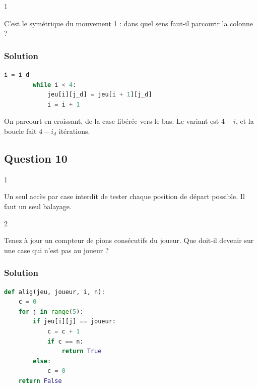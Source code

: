 \documentclass[11pt,a4paper]{article}
\begin{document}
\begin{indication}{1}

C'est le symétrique du mouvement 1 : dans quel sens faut-il parcourir la colonne ?

\end{indication}

\hypertarget{solution-8}{%
\subsubsection{Solution}\label{solution-8}}

\begin{lstlisting}[language=Python]
        i = i_d
        while i < 4:
            jeu[i][j_d] = jeu[i + 1][j_d]
            i = i + 1
\end{lstlisting}

On parcourt en croissant, de la case libérée vers le bas. Le variant est \(4-i\), et la boucle fait \(4-i_d\) itérations.

\hypertarget{question-10}{%
\subsection{Question 10}\label{question-10}}

\begin{indication}{1}

Un seul accès par case interdit de tester chaque position de départ possible. Il faut un seul balayage.

\end{indication}

\begin{indication}{2}

Tenez à jour un compteur de pions consécutifs du joueur. Que doit-il devenir sur une case qui n'est pas au joueur ?

\end{indication}

\hypertarget{solution-9}{%
\subsubsection{Solution}\label{solution-9}}

\begin{lstlisting}[language=Python]
def alig(jeu, joueur, i, n):
    c = 0
    for j in range(5):
        if jeu[i][j] == joueur:
            c = c + 1
            if c == n:
                return True
        else:
            c = 0
    return False
\end{lstlisting}
\end{document}
